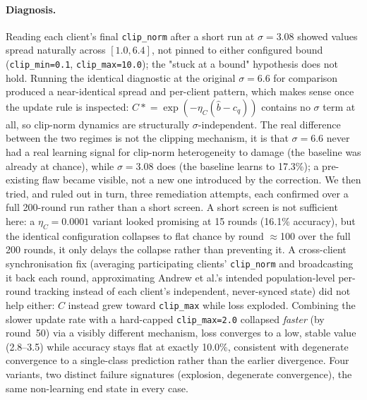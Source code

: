 \documentclass[12pt,a4paper]{article}
\begin{document}
\paragraph{Diagnosis.} Reading each client's final \texttt{clip\_norm}
after a short run at $\sigma=3.08$ showed values spread naturally
across $[1.0, 6.4]$, not pinned to either configured bound
(\texttt{clip\_min=0.1}, \texttt{clip\_max=10.0}); the "stuck at a
bound" hypothesis does not hold. Running the identical diagnostic at
the original $\sigma=6.6$ for comparison produced a near-identical
spread and per-client pattern, which makes sense once the update rule
is inspected: $C \mathrel{*}= \exp(-\eta_C(\hat b - c_q))$ contains no
$\sigma$ term at all, so clip-norm dynamics are structurally
$\sigma$-independent. The real difference between the two regimes is
not the clipping mechanism, it is that $\sigma=6.6$ never had a real
learning signal for clip-norm heterogeneity to damage (the baseline
was already at chance), while $\sigma=3.08$ does (the baseline learns
to 17.3\%); a pre-existing flaw became visible, not a new one
introduced by the correction. We then tried, and ruled out in turn,
three remediation attempts, each confirmed over a full 200-round run
rather than a short screen. A short screen is not sufficient here: a
$\eta_C=0.0001$ variant looked promising at 15 rounds (16.1\%
accuracy), but the identical configuration collapses to flat chance by
round $\approx$100 over the full 200 rounds, it only delays the
collapse rather than preventing it.
A cross-client synchronisation fix (averaging participating clients'
\texttt{clip\_norm} and broadcasting it back each round, approximating
Andrew et al.'s intended population-level per-round tracking instead
of each client's independent, never-synced state) did not help either:
$C$ instead grew toward \texttt{clip\_max} while loss exploded.
Combining the slower update rate with a hard-capped
\texttt{clip\_max=2.0} collapsed \emph{faster} (by round~50) via a
visibly different mechanism, loss converges to a low, stable value
(2.8--3.5) while accuracy stays flat at exactly 10.0\%, consistent
with degenerate convergence to a single-class prediction rather than
the earlier divergence. Four variants, two distinct failure
signatures (explosion, degenerate convergence), the same non-learning
end state in every case.
\end{document}
